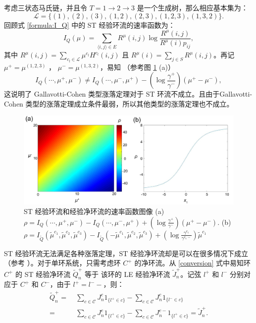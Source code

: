 考虑三状态马氏链，并且令 $T = 1\to 2\to 3$ 是一个生成树，那么相应基本集为：
\begin{equation*}
\mathcal{L} = \{(1),(2),(3),(1,2),(2,3),(1,2,3),(1,3,2)\}.
\end{equation*}
回顾式 \eqref{formula:I_Q} 中的 ST 经验环流的速率函数为：
\begin{equation*}
I_Q(\mu) = \sum_{\langle i,j\rangle\in E}R^{\mu}(i,j)\log\frac{R^{\mu}(i,j)}{R^{\mu}(i)p_{ij}},
\end{equation*}
其中 $R^{\mu}(i,j)=\sum_{c_l\in\mathcal{L}}\mu^{c_l}H^{c_l}(i,j)$ 且 $R^{\mu}(i)=\sum_{j\in S}R^{\mu}(i,j)$。再记 $\mu^+ = \mu^{(1,2,3)}$ ， $\mu^- = \mu^{(1,3,2)}$，易知 （参考图 \ref{figure:ratefunction} (a)）
\begin{equation*}
I_Q(\cdots,\mu^+,\mu^-)
\neq I_Q(\cdots,\mu^-,\mu^+)-\left(\log\frac{\gamma^+}{\gamma^-}\right)(\mu^+-\mu^-),
\end{equation*}
这说明了 Gallavotti-Cohen 类型涨落定理对于 ST 环流不成立。且由于Gallavotti-Cohen 类型的涨落定理成立条件最弱，所以其他类型的涨落定理也不成立。
\begin{figure}[h]
	\centering
	\includegraphics[scale=0.25]{chart/ratefunction.pdf}
	\caption{ST 经验环流和经验净环流的速率函数图像 (a) $\rho=I_Q(\cdots,\mu^+,\mu^-)-I_Q(\cdots,\mu^-,\mu^+)+(\log\frac{\gamma^+}{\gamma^-})(\mu^+-\mu^-)$. (b) $\rho=I_{\tilde{Q}}(\tilde{\mu}^{c_1},\tilde{\mu}^{c_2},\tilde{\mu}^{c_3})- I_{\tilde{Q}}(-\tilde{\mu}^{c_1},\tilde{\mu}^{c_2},\tilde{\mu}^{c_3})
		+(\log\frac{\gamma^{c_1}}{\gamma^{c_1-}})\tilde{\mu}^{c_1}$}\label{figure:ratefunction}
\end{figure}
ST 经验环流无法满足各种涨落定理，ST 经验净环流却是可以在很多情况下成立（参考 \cite{andrieux2007fluctuation,bertini2015flows}）。对于单环系统，只需考虑环 $C^+$ 的净环流。从 \eqref{conversion} 式中易知环 $C^+$ 的 ST 经验净环流  $\tilde{Q}^+_n$ 等于 该环的 LE 经验净环流 $\tilde{J}^+_n$。记弦 $l^+$ 和 $l^-$ 分别对应于 $C^+$ 和 $C^-$，由于 $l^+=l^--$，则：
\begin{equation*}\label{circulation}
    \begin{split}
            \tilde{Q}^{+}_n =&\;\sum_{c\in \mathcal{C}}J^c_n1_{\{l^+\in c \}}-\sum_{c\in \mathcal{C}}J^c_n1_{\{l^-\in c \}}\\
            =&\;\sum_{c\in \mathcal{C}}J^c_n1_{\{l^+\in c \}}-\sum_{c\in \mathcal{C}}J^{c-}_n1_{\{l^+\in c \}} = \tilde{J}^+_n.
    \end{split}
\end{equation*}
